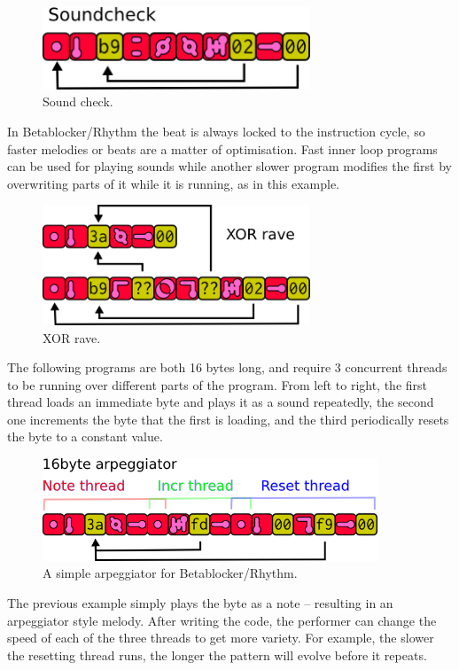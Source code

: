 \documentclass[letterpaper, 12pt]{article}
\begin{document}
\begin{figure}[H]
	\centering
		\includegraphics[width=8cm]{bbds-sndchk1}
	\caption{Sound check.}
	\label{fig:fig_bbds-sndchk1}
\end{figure}

In Betablocker/Rhythm the beat is always locked to the instruction cycle, so faster melodies or beats are a matter of optimisation. Fast inner loop programs can be used for playing sounds while another slower program modifies the first by overwriting parts of it while it is running, as in this example.

\begin{figure}[H]
	\centering
		\includegraphics[width=8cm]{bbds-xorrave}
	\caption{XOR rave.}
	\label{fig:fig_bbds-xorrave}
\end{figure}

The following programs are both 16 bytes long, and require 3 concurrent threads to be running over different parts of the program. From left to right, the first thread loads an immediate byte and plays it as a sound repeatedly, the second one increments the byte that the first is loading, and the third periodically resets the byte to a constant value.

\begin{figure}[H]
	\centering
		\includegraphics[width=10cm]{bbds-arp}
	\caption{A simple arpeggiator for Betablocker/Rhythm.}
	\label{fig:fig_bbds-arp}
\end{figure}

The previous example simply plays the byte as a note -- resulting in an arpeggiator style melody. After writing the code, the performer can change the speed of each of the three threads to get more variety. For example, the slower the resetting thread runs, the longer the pattern will evolve before it repeats.
\end{document}
